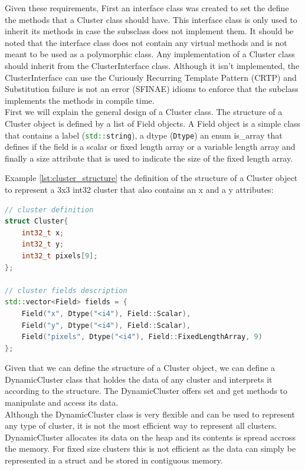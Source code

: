 \begin{spacing}{1.2}
    Given these requirements, First an interface class was created to set the define the methods that a Cluster class should have.
    This interface class is only used to inherit its methods in case the subsclass does not implement them. It should be
    noted that the interface class does not contain any virtual methods and is not meant to be used as a polymorphic
    class. Any implementation of a Cluster class should inherit from the ClusterInterface class. Although it isn't
    implemented, the ClusterInterface can use the Curiously Recurring Template Pattern (CRTP) and Substitution failure
    is not an error (SFINAE) idioms to enforce that the subclass implements the methods in compile time.\\

    First we will explain the general design of a Cluster class. The structure of a Cluster object is defined by a
    list of Field objects. A Field object is a simple class that contains a label (\lstinline[language=C++]{std::string}), a
    dtype (\lstinline[language=C++]{Dtype}) an enum is\_array that defines if the field is a scalar or fixed length array or a
    variable length array and finally a size attribute that is used to indicate the size of the fixed length array.

    Example \ref{lst:cluster_structure} the definition of the structure of a Cluster object to represent a 3x3 int32 cluster
    that also contains an x and a y attributes:
    \begin{lstlisting}[language=C++, caption={Example: Definition of a Cluster structure},label={lst:cluster_structure}]
// cluster definition
struct Cluster{
    int32_t x;
    int32_t y;
    int32_t pixels[9];
};

// cluster fields description
std::vector<Field> fields = {
    Field("x", Dtype("<i4"), Field::Scalar),
    Field("y", Dtype("<i4"), Field::Scalar),
    Field("pixels", Dtype("<i4"), Field::FixedLengthArray, 9)
};
    \end{lstlisting}

    Given that we can define the structure of a Cluster object, we can define a DynamicCluster class that holdes the data of any
    cluster and interprets it according to the structure. The DynamicCluster offers set and get methods to manipulate and access
    its data.\\

    Although the DynamicCluster class is very flexible and can be used to represent any type of cluster, it is not the most efficient
    way to represent all clusters. DynamicCluster allocates its data on the heap and its contents is spread accross the memory.
    For fixed size clusters this is not efficient as the data can simply be represented in a struct and be stored in contiguous
    memory.


\end{spacing}
